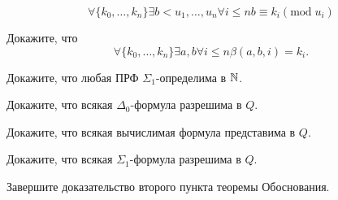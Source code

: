 \documentclass[a4paper, 12pt, num=Г4]{listok}
\begin{document}
\begin{theorem}
\[
	\forall{\{k_0, \dots, k_n\}} \exists{b < u_1, \dots, u_n} \forall{i \le n} b \equiv k_i (\mathrm{mod}\; u_i)
\]
\end{theorem}
\begin{problem}
	Докажите, что
	\[
		\forall{\{k_0, \dots, k_n\}} \exists{a, b} \forall{i \le n} \beta(a, b, i) = k_i.
	\]
\end{problem}
\begin{problem}
	Докажите, что любая ПРФ $\Sigma_1$-определима в $\mathbb{N}$.
\end{problem}
\begin{problem}
	Докажите, что всякая $\Delta_0$-формула разрешима в $Q$.
\end{problem}
\begin{problem}
	Докажите, что всякая вычислимая формула представима в $Q$.
\end{problem}
\begin{problem}
	Докажите, что всякая $\Sigma_1$-формула разрешима в $Q$.
\end{problem}
\begin{problem}
	Завершите доказательство второго пункта теоремы Обоснования.
\end{problem}
\end{document}

